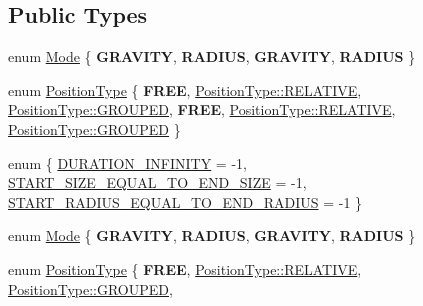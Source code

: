 \subsection*{Public Types}
\begin{DoxyCompactItemize}
\item 
enum \hyperlink{classParticleSystem_aa380bd1c6062c44d56268a61ade9c8fb}{Mode} \{ {\bfseries G\+R\+A\+V\+I\+TY}, 
{\bfseries R\+A\+D\+I\+US}, 
{\bfseries G\+R\+A\+V\+I\+TY}, 
{\bfseries R\+A\+D\+I\+US}
 \}
\item 
enum \hyperlink{classParticleSystem_a9856f9eca1df7c6f2a2e54a1549cff27}{Position\+Type} \{ \newline
{\bfseries F\+R\+EE}, 
\hyperlink{classParticleSystem_a9856f9eca1df7c6f2a2e54a1549cff27ac3cb497d8ec3c88b9024774b775358e2}{Position\+Type\+::\+R\+E\+L\+A\+T\+I\+VE}, 
\hyperlink{classParticleSystem_a9856f9eca1df7c6f2a2e54a1549cff27a5949e53c5710048bf96c5a5b01c280fb}{Position\+Type\+::\+G\+R\+O\+U\+P\+ED}, 
{\bfseries F\+R\+EE}, 
\newline
\hyperlink{classParticleSystem_a9856f9eca1df7c6f2a2e54a1549cff27ac3cb497d8ec3c88b9024774b775358e2}{Position\+Type\+::\+R\+E\+L\+A\+T\+I\+VE}, 
\hyperlink{classParticleSystem_a9856f9eca1df7c6f2a2e54a1549cff27a5949e53c5710048bf96c5a5b01c280fb}{Position\+Type\+::\+G\+R\+O\+U\+P\+ED}
 \}
\item 
enum \{ \hyperlink{classParticleSystem_aa236a18f197392fbac344ac5ff36ac39a005a51eec4f9b1a0556d03b49f3c6584}{D\+U\+R\+A\+T\+I\+O\+N\+\_\+\+I\+N\+F\+I\+N\+I\+TY} = -\/1, 
\hyperlink{classParticleSystem_aa236a18f197392fbac344ac5ff36ac39a1b27ee25dba8ff992a5d8c741c4b1b53}{S\+T\+A\+R\+T\+\_\+\+S\+I\+Z\+E\+\_\+\+E\+Q\+U\+A\+L\+\_\+\+T\+O\+\_\+\+E\+N\+D\+\_\+\+S\+I\+ZE} = -\/1, 
\hyperlink{classParticleSystem_aa236a18f197392fbac344ac5ff36ac39aba3b743d3a47216fdb0041d95da54a55}{S\+T\+A\+R\+T\+\_\+\+R\+A\+D\+I\+U\+S\+\_\+\+E\+Q\+U\+A\+L\+\_\+\+T\+O\+\_\+\+E\+N\+D\+\_\+\+R\+A\+D\+I\+US} = -\/1
 \}
\item 
enum \hyperlink{classParticleSystem_aa380bd1c6062c44d56268a61ade9c8fb}{Mode} \{ {\bfseries G\+R\+A\+V\+I\+TY}, 
{\bfseries R\+A\+D\+I\+US}, 
{\bfseries G\+R\+A\+V\+I\+TY}, 
{\bfseries R\+A\+D\+I\+US}
 \}
\item 
enum \hyperlink{classParticleSystem_a9856f9eca1df7c6f2a2e54a1549cff27}{Position\+Type} \{ \newline
{\bfseries F\+R\+EE}, 
\hyperlink{classParticleSystem_a9856f9eca1df7c6f2a2e54a1549cff27ac3cb497d8ec3c88b9024774b775358e2}{Position\+Type\+::\+R\+E\+L\+A\+T\+I\+VE}, 
\hyperlink{classParticleSystem_a9856f9eca1df7c6f2a2e54a1549cff27a5949e53c5710048bf96c5a5b01c280fb}{Position\+Type\+::\+G\+R\+O\+U\+P\+ED}, 

\end{DoxyCompactItemize}
